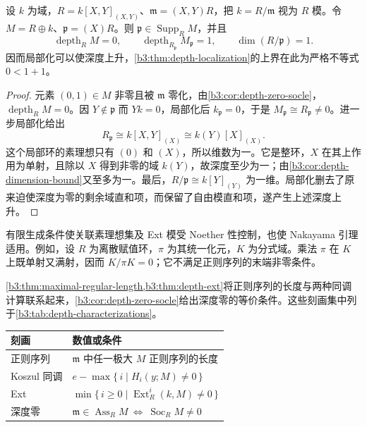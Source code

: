 \begin{proposition}\label{b3:prop:depth-localization-example}
	设 \(k\) 为域，\(R=k[X,Y]_{(X,Y)}\)、\(\mathfrak m=(X,Y)R\)，把 \(k=R/\mathfrak m\) 视为 \(R\) 模。令 \(M=R\oplus k\)、\(\mathfrak p=(X)R\)。则 \(\mathfrak p\in\operatorname{Supp}_RM\)，并且
	\[
		\operatorname{depth}_RM=0,\qquad \operatorname{depth}_{R_{\mathfrak p}}M_{\mathfrak p}=1, \qquad\dim(R/\mathfrak p)=1.
	\]
	因而局部化可以使深度上升，\cref{b3:thm:depth-localization}的上界在此为严格不等式 \(0<1+1\)。
\end{proposition}
\begin{proof}
	元素 \((0,1)\in M\) 非零且被 \(\mathfrak m\) 零化，由\cref{b3:cor:depth-zero-socle}，\(\operatorname{depth}_RM=0\)。因 \(Y\notin\mathfrak p\) 而 \(Yk=0\)，局部化后 \(k_{\mathfrak p}=0\)，于是 \(M_{\mathfrak p}\cong R_{\mathfrak p}\ne0\)。进一步局部化给出
	\[
		R_{\mathfrak p}\cong k[X,Y]_{(X)} \cong k(Y)[X]_{(X)}.
	\]
	这个局部环的素理想只有 \((0)\) 和 \((X)\)，所以维数为一。它是整环，\(X\) 在其上作用为单射，且除以 \(X\) 得到非零的域 \(k(Y)\)，故深度至少为一；由\cref{b3:cor:depth-dimension-bound}又至多为一。最后，\(R/\mathfrak p\cong k[Y]_{(Y)}\) 为一维。局部化删去了原来迫使深度为零的剩余域直和项，而保留了自由模直和项，遂产生上述深度上升。
\end{proof}

有限生成条件使关联素理想集及 Ext 模受 Noether 性控制，也使 Nakayama 引理适用。例如，设 \(R\) 为离散赋值环，\(\pi\) 为其统一化元，\(K\) 为分式域。乘法 \(\pi\) 在 \(K\) 上既单射又满射，因而 \(K/\pi K=0\)；它不满足正则序列的末端非零条件。

\ProseParagraphBreak
\cref{b3:thm:maximal-regular-length,b3:thm:depth-ext}将正则序列的长度与两种同调计算联系起来，\cref{b3:cor:depth-zero-socle}给出深度零的等价条件。这些刻画集中列于\cref{b3:tab:depth-characterizations}。

\begin{center}
	\begin{minipage}{\textwidth}
		\makeatletter
		\def\@captype{table}
		\makeatother
		\centering
		\caption[深度的三种刻画]{深度的三种刻画。设 \((R,\mathfrak m)\) 为交换 Noether 局部环，\(M\ne0\) 为有限生成的 \(R\) 模，\(k=R/\mathfrak m\)，\(y=(y_1,\ldots,y_e)\) 为 \(\mathfrak m\) 的任意有限生成组。前三行给出同一个数值，末行列出该数值为零时的等价条件。}
		\label{b3:tab:depth-characterizations}
		\begin{tabularx}{\textwidth}{@{}>{\raggedright\arraybackslash}p{}>{\raggedright\arraybackslash}X@{}}
			\toprule
			刻画 & 数值或条件\\
			\midrule
			正则序列 & \(\mathfrak m\) 中任一极大 \(M\) 正则序列的长度\\
			Koszul 同调 & \(e-\max\{\,i\mid H_i(y;M)\ne0\,\}\)\\
			Ext & \(\min\{\,i\ge0\mid\operatorname{Ext}_R^i(k,M)\ne0\,\}\)\\
			深度零 & \(\mathfrak m\in\operatorname{Ass}_RM\ \Longleftrightarrow\ \operatorname{Soc}_RM\ne0\)\\
			\bottomrule
		\end{tabularx}
	\end{minipage}
\end{center}
